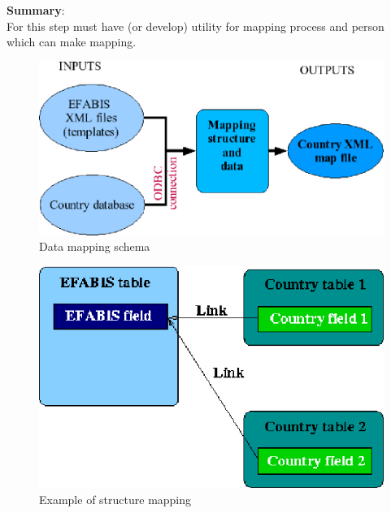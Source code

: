 \textbf{Summary}:\\
For this step must have (or develop) utility for mapping process and person which can make mapping.\\
\begin{figure}
   \centering
   \includegraphics{./loading_from_other_db/schema2b.eps}
   \caption{Data mapping schema}
   \label{fig:schema2}
\end{figure}
\begin{figure}
   \centering
   \includegraphics{./loading_from_other_db/map_ex1.eps}
   \caption{Example of structure mapping}
   \label{fig:map_ex1}
\end{figure}

